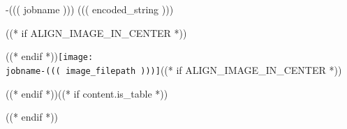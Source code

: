 \begin{filecontents*}{\jobname-((( jobname )))}
((( encoded_string )))
\end{filecontents*}
\immediate{}((* if ALIGN_IMAGE_IN_CENTER *))\begin{center}((* endif *))\texttt{[image: \\jobname-((( image\_filepath )))]}((* if ALIGN_IMAGE_IN_CENTER *))\end{center}((* endif *))((* if content.is_table *))\par\vspace{-5pt}((* endif *))
